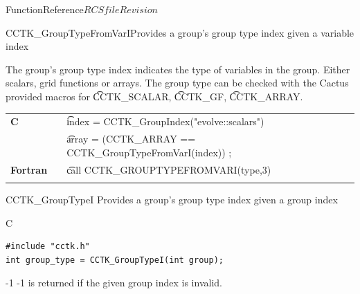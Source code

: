 \begin{cactuspart}{FunctionReference}{$RCSfile$}{$Revision$}
\begin{CCTKFunc}{CCTK\_GroupTypeFromVarI}{Provides a group's group type
               index given a variable index}
\label{CCTK-GroupTypeFromVarI}
\showargs
\begin{params}
\end{params}
\begin{discussion}
The group's group type index indicates the type of variables in the group.
Either scalars, grid functions or arrays. The group type can be checked
with the Cactus provided macros for {\t CCTK\_SCALAR}, {\t CCTK\_GF}, {\t CCTK\_ARRAY}.
\end{discussion}
\begin{examples}
\begin{tabular}{@{}p{3cm}cp{11cm}}
\hfill {\bf C} && {\t index = CCTK\_GroupIndex("evolve::scalars")}\\
               &&{\t array = (CCTK\_ARRAY == CCTK\_GroupTypeFromVarI(index)) ;}
\\
\hfill {\bf Fortran} && {\t call CCTK\_GROUPTYPEFROMVARI(type,3)}\\
\\
\end{tabular}
\end{examples}
\begin{errorcodes}
\end{errorcodes}
\end{CCTKFunc}

\begin{FunctionDescription}{CCTK\_GroupTypeI}{}
\label{CCTK-GroupTypeI}
Provides a group's group type index given a group index
\begin{SynopsisSection}
\begin{Synopsis}{C}
\begin{verbatim}
#include "cctk.h"
int group_type = CCTK_GroupTypeI(int group);
\end{verbatim}
\end{Synopsis}
\end{SynopsisSection}

\begin{ResultSection}
\begin{Result}{-1}
-1 is returned if the given group index is invalid.
\end{Result}
\end{ResultSection}


\end{FunctionDescription}
\end{cactuspart}
